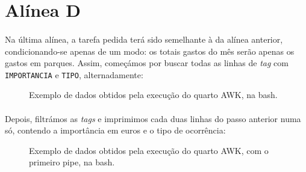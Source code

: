 \documentclass[11pt,a4paper]{report}
\begin{document}
\section{Alínea D}


\paragraph*{}Na última alínea, a tarefa pedida terá sido semelhante à da alínea anterior, condicionando-se apenas de um modo: os totais gastos do mês serão apenas os gastos em parques. Assim, começámos por buscar todas as linhas de \textit{tag} com \texttt{IMPORTANCIA} e \texttt{TIPO}, alternadamente:

\begin{figure}[H]
\centering
\noindent{}
\caption{Exemplo de dados obtidos pela execução do quarto AWK, na bash.}
\end{figure}

\paragraph*{}Depois, filtrámos as \textit{tags} e imprimimos cada duas linhas do passo anterior numa só, contendo a importância em euros e o tipo de ocorrência:

\begin{figure}[H]
\centering
\noindent{}
\caption{Exemplo de dados obtidos pela execução do quarto AWK, com o primeiro pipe, na bash.}
\end{figure}
\end{document}
